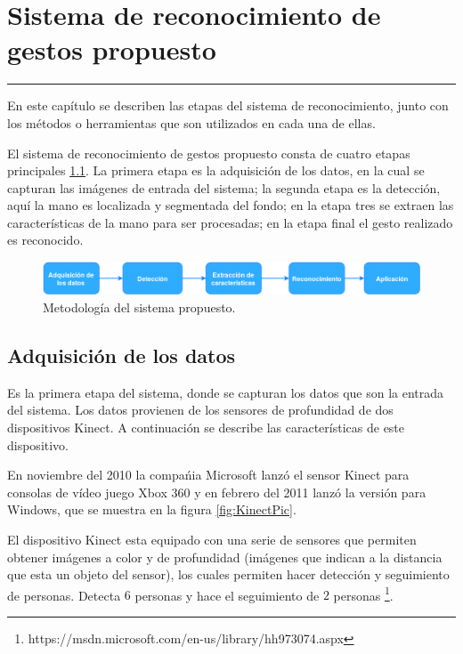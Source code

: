 \chapter{Sistema de reconocimiento de gestos propuesto}\label{capit:cap3}
\vspace{-2.0325ex}%
\noindent
\rule{\textwidth}{0.5pt}
\vspace{-5.5ex}%
\newcommand{\pushline}{\Indp}%

En este cap\'itulo se describen las etapas del sistema de reconocimiento, junto con los métodos o herramientas que son utilizados en cada una de ellas.   

El sistema de reconocimiento de gestos propuesto consta de cuatro etapas principales \ref{fig:MyHGR}. La primera etapa es la adquisición de los datos, en la cual se capturan las imágenes de entrada del sistema; la segunda etapa es la detección, aquí la mano es localizada y segmentada del fondo; en la etapa tres se extraen las características de la mano para ser procesadas; en la etapa final el gesto realizado es reconocido.   

\begin{figure}[h!]
\begin{center}
\includegraphics[scale=.5]{./Figures/MyHGR.png}
\end{center}
\caption{Metodología del sistema propuesto.}
\label{fig:MyHGR}
\end{figure}  
  
\section{Adquisición de los datos}\label{sec:KinectSensor} 

Es la primera etapa del sistema, donde se capturan los datos que son la entrada del sistema. Los datos provienen de los sensores de profundidad de dos dispositivos Kinect. A continuación se describe las características de este dispositivo. 

En noviembre del 2010 la compa\'nia Microsoft lanz\'o el sensor Kinect para consolas de vídeo juego Xbox 360 y en febrero del 2011 lanz\'o la versi\'on para Windows, que se muestra en la figura \ref{fig:KinectPic}.  

El dispositivo Kinect esta equipado con una serie de sensores que permiten obtener imágenes a color y de profundidad (imágenes que indican a la distancia que esta un objeto del sensor), los cuales permiten hacer detección y seguimiento de personas. Detecta $6$ personas y hace el seguimiento de $2$ personas \footnote{https://msdn.microsoft.com/en-us/library/hh973074.aspx}.    
  
